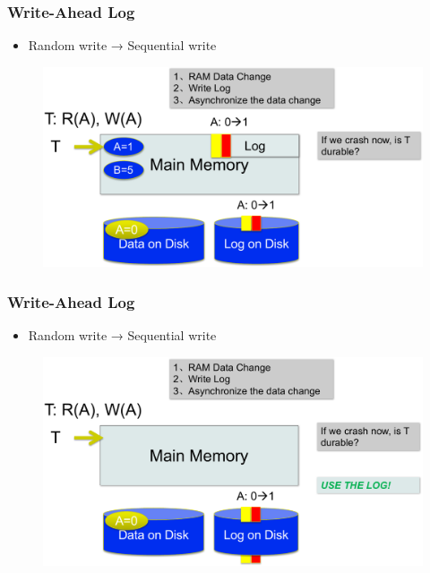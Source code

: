 \begin{frame}[fragile]
	\frametitle{Write-Ahead Log}
	\begin{itemize}
		\item Random write → Sequential write
	\end{itemize}
	\begin{figure}
		\includegraphics[width=.68\linewidth]{figs/dbfile-wal1.pdf}
	\end{figure}
\end{frame}

\begin{frame}[fragile]
	\frametitle{Write-Ahead Log}
	\begin{itemize}
		\item Random write → Sequential write
	\end{itemize}
	\begin{figure}
		\includegraphics[width=.68\linewidth]{figs/dbfile-wal2.pdf}
	\end{figure}
\end{frame}

